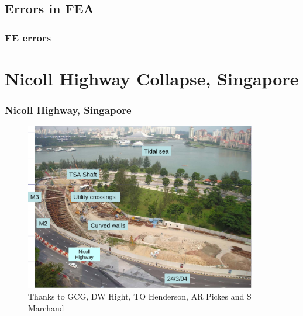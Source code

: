 \documentclass[notes]{beamer}
\begin{document}
\subsection{Errors in FEA}
\begin{frame}
\frametitle{FE errors}
\end{frame}

\section{Nicoll Highway Collapse, Singapore}
\begin{frame}
\frametitle{Nicoll Highway, Singapore}
\begin{figure}[ht]
	\centering
	\includegraphics[width=0.9\textwidth]{figs/nicoll-highway.png}
	\caption{Thanks to GCG, DW Hight, TO Henderson, AR Pickes and S Marchand }
\end{figure}
\end{frame}
\end{document}
